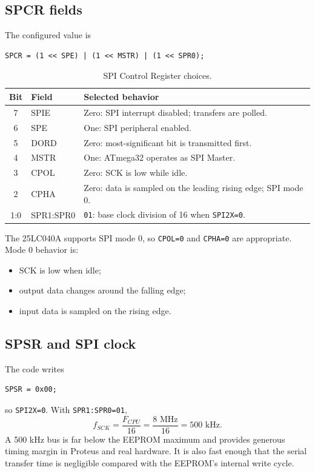 \documentclass[11pt,a4paper]{article}
\begin{document}
\subsection{SPCR fields}
The configured value is
\begin{lstlisting}[style=cstyle]
SPCR = (1 << SPE) | (1 << MSTR) | (1 << SPR0);
\end{lstlisting}

\begin{table}[H]
\centering
\caption{SPI Control Register choices.}
\begin{tabular}{clp{}}
\toprule
Bit & Field & Selected behavior \\
\midrule
7 & SPIE & Zero: SPI interrupt disabled; transfers are polled. \\
6 & SPE & One: SPI peripheral enabled. \\
5 & DORD & Zero: most-significant bit is transmitted first. \\
4 & MSTR & One: ATmega32 operates as SPI Master. \\
3 & CPOL & Zero: SCK is low while idle. \\
2 & CPHA & Zero: data is sampled on the leading rising edge; SPI mode 0. \\
1:0 & SPR1:SPR0 & \texttt{01}: base clock division of 16 when \texttt{SPI2X=0}. \\
\bottomrule
\end{tabular}
\end{table}

The 25LC040A supports SPI mode 0, so \texttt{CPOL=0} and \texttt{CPHA=0} are appropriate. Mode 0 behavior is:
\begin{itemize}
  \item SCK is low when idle;
  \item output data changes around the falling edge;
  \item input data is sampled on the rising edge.
\end{itemize}

\subsection{SPSR and SPI clock}
The code writes
\begin{lstlisting}[style=cstyle]
SPSR = 0x00;
\end{lstlisting}
so \texttt{SPI2X=0}. With \texttt{SPR1:SPR0=01},
\[
f_{SCK}=\frac{F_{CPU}}{16}=\frac{8\text{ MHz}}{16}=500\text{ kHz}.
\]
A 500 kHz bus is far below the EEPROM maximum and provides generous timing margin in Proteus and real hardware. It is also fast enough that the serial transfer time is negligible compared with the EEPROM's internal write cycle.
\end{document}

